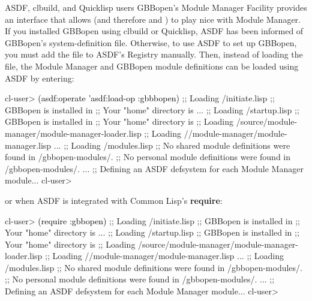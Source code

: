 \documentclass[10pt,twoside,english,pdftex]{article}
\begin{document}
%
%
\begin{notebox}{ASDF, clbuild, and Quicklisp users}
  GBBopen's Module Manager Facility provides an interface that allows
   (and therefore
   and
  ) to play nice with Module
  Manager.  If you installed GBBopen using clbuild or Quicklisp, ASDF has been
  informed of GBBopen's 
  system-definition file.  Otherwise, to use ASDF to set up GBBopen, you must
  add the  file to ASDF's Registry manually.  Then,
  instead of loading the 
  file, the Module Manager and GBBopen module definitions can be loaded using
  ASDF by entering:
%
\T\smallskip
\W\supp\notpretop
\begin{smallexample}
\textcolor{darkergray}{%
  cl-user> \textcolor{black}{(asdf:operate 'asdf:load-op :gbbbopen)}
  ;; Loading /initiate.lisp
  ;; GBBopen is installed in 
  ;; Your "home" directory is 
       ...
  ;; Loading /startup.lisp
  ;; GBBopen is installed in 
  ;; Your "home" directory is 
  ;;  Loading /source/module-manager/module-manager-loader.lisp
  ;; Loading //module-manager/module-manager.lisp
       ...
  ;; Loading /modules.lisp
  ;; No shared module definitions were found in /gbbopen-modules/.
  ;; No personal module definitions were found in /gbbopen-modules/.
       ...
  ;; Defining an ASDF defsystem for each Module Manager module...
  cl-user>}
\end{smallexample}
%
or when ASDF is integrated with Common Lisp's \textbf{require}:
%
\T\smallskip
\W\supp\notpretop
\begin{smallexample}
\textcolor{darkergray}{%
  cl-user> \textcolor{black}{(require :gbbopen)}
  ;; Loading /initiate.lisp
  ;; GBBopen is installed in 
  ;; Your "home" directory is 
       ...
  ;; Loading /startup.lisp
  ;; GBBopen is installed in 
  ;; Your "home" directory is 
  ;;  Loading /source/module-manager/module-manager-loader.lisp
  ;; Loading //module-manager/module-manager.lisp
       ...
  ;; Loading /modules.lisp
  ;; No shared module definitions were found in /gbbopen-modules/.
  ;; No personal module definitions were found in /gbbopen-modules/.
       ...
  ;; Defining an ASDF defsystem for each Module Manager module...
  cl-user>}
\end{smallexample}


\end{notebox}
\end{document}

